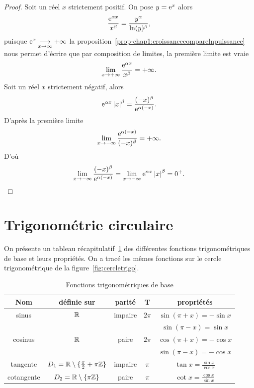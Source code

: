 \begin{proof}
  Soit un réel \(x\) strictement positif. On pose \(y=\operatorname{e}^{x}\) alors
  \begin{equation}
    \frac{\operatorname{e}^{\alpha x}}{x^\beta}=\frac{y^\alpha}{\ln(y)^\beta},
  \end{equation}
  puisque \(\operatorname{e}^{x} \underset{x \to \infty}{\longrightarrow}+\infty\) la proposition~\ref{prop-chap1:croissancecomparelnpuissance} nous permet d'écrire que par composition de limites, la première limite est vraie
  \begin{equation}
    \lim\limits_{x \to + \infty} \frac{\operatorname{e}^{\alpha x}}{x^\beta}=+\infty.
  \end{equation}
  Soit un réel \(x\) strictement négatif, alors
  \begin{equation}
    \operatorname{e}^{\alpha x}\left\lvert x\right\rvert^\beta=\frac{(-x)^\beta}{\operatorname{e}^{\alpha(-x)}}.
  \end{equation}
  D'après la première limite
  \begin{equation}
    \lim\limits_{x \to - \infty} \frac{\operatorname{e}^{\alpha (-x)}}{(-x)^\beta}=+\infty.
  \end{equation}
  D'où
  \begin{equation}
    \lim\limits_{x\to -\infty}\frac{(-x)^\beta}{\operatorname{e}^{\alpha (-x)}}=\lim\limits_{x \to -\infty} \operatorname{e}^{\alpha x} \left\lvert x\right\rvert^\beta=0^+.
  \end{equation}
\end{proof}
%
\section{Trigonométrie circulaire}
\label{sec:chap1-trigocirc}
On présente un tableau récapitulatif~\ref{tab:fonctiontrigo} des différentes fonctions trigonométriques de base et leurs propriétés. On a tracé les mêmes fonctions sur le cercle trigonométrique de la figure~\ref{fig:cercletrigo}.
\begin{table}[!h]
  \centering
  \begin{tabular}{|c|c|c|c|c|}
    \hline
    Nom & définie sur & parité & T & propriétés \\ \hline
    sinus & \(\mathbb{R}\) & impaire & \(2\pi\) & \(\sin(\pi+x)=-\sin x\) \\
    & & & & \(\sin(\pi-x)=\sin x\) \\ \hline
    cosinus & \(\mathbb{R}\) & paire & \(2\pi\) & \(\cos(\pi+x)=-\cos x\)\\
    & & & & \( \sin(\pi-x)=-\cos x\) \\ \hline
    tangente & \(D_1=\mathbb{R}\setminus\{\frac{\pi}{2}+\pi \mathbb{Z}\}\) & impaire & \(\pi\) & \(\tan x =\frac{\sin x}{\cos x}\) \\ \hline
    cotangente & \(D_2=\mathbb{R}\setminus\{\pi \mathbb{Z}\}\) & paire & \(\pi\) & \(\cot x =\frac{\cos x}{\sin x}\) \\ \hline
  \end{tabular}
  \caption{Fonctions trigonométriques de base}
  \label{tab:fonctiontrigo}
\end{table}

